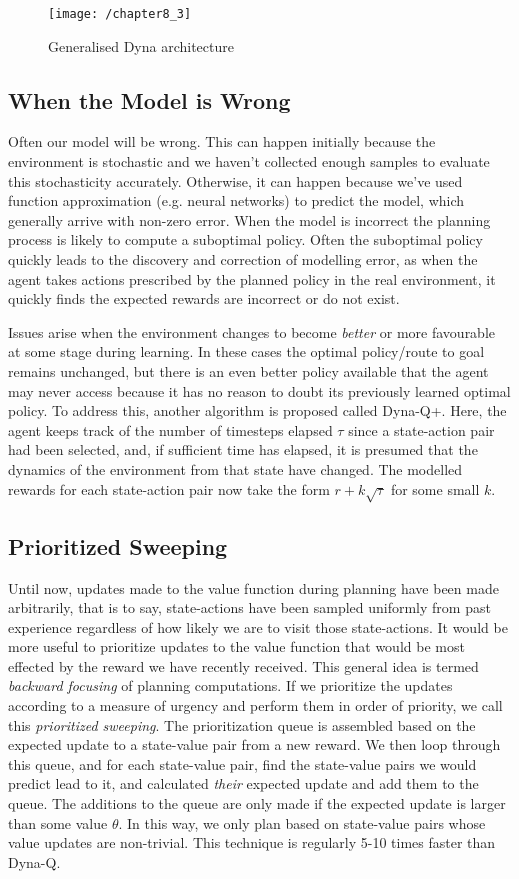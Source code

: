 \begin{figure}
	\centering
	\texttt{[image: /chapter8\_3]}
	\caption{Generalised Dyna architecture}
	\label{fig: dyna}
\end{figure}

\subsection{When the Model is Wrong}
Often our model will be wrong. This can happen initially because the environment is stochastic and we haven't collected enough samples to evaluate this stochasticity accurately. Otherwise, it can happen because we've used function approximation (e.g. neural networks) to predict the model, which generally arrive with non-zero error. When the model is incorrect the planning process is likely to compute a suboptimal policy. Often the suboptimal policy quickly leads to the discovery and correction of modelling error, as when the agent takes actions prescribed by the planned policy in the real environment, it quickly finds the expected rewards are incorrect or do not exist. 

Issues arise when the environment changes to become \textit{better} or more favourable at some stage during learning. In these cases the optimal policy/route to goal remains unchanged, but there is an even better policy available that the agent may never access because it has no reason to doubt its previously learned optimal policy. To address this, another algorithm is proposed called Dyna-Q+. Here, the agent keeps track of the number of timesteps elapsed $\tau$ since a state-action pair had been selected, and, if sufficient time has elapsed, it is presumed that the dynamics of the environment from that state have changed. The modelled rewards for each state-action pair now take the form $r + k\sqrt{\tau}$ for some small $k$.

\subsection{Prioritized Sweeping}
Until now, updates made to the value function during planning have been made arbitrarily, that is to say, state-actions have been sampled uniformly from past experience regardless of how likely we are to visit those state-actions. It would be more useful to prioritize updates to the value function that would be most effected by the reward we have recently received. This general idea is termed \textit{backward focusing} of planning computations. If we prioritize the updates according to a measure of urgency and perform them in order of priority, we call this \textit{prioritized sweeping}. The prioritization queue is assembled based on the expected update to a state-value pair from a new reward. We then loop through this queue, and for each state-value pair, find the state-value pairs we would predict lead to it, and calculated \textit{their} expected update and add them to the queue. The additions to the queue are only made if the expected update is larger than some value $\theta$. In this way, we only plan based on state-value pairs whose value updates are non-trivial. This technique is regularly 5-10 times faster than Dyna-Q.

